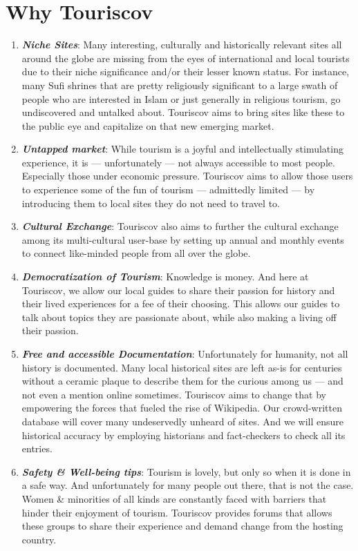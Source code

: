 \documentclass[12pt]{article}
\begin{document}
\section{Why Touriscov}
\begin{enumerate}[label= \roman*.]
    \item \textbf{\textit{Niche Sites}}: Many interesting, culturally and historically relevant sites all around the globe are missing from the eyes of international and local tourists due to their niche significance and/or their lesser known status. For instance, many Sufi shrines that are pretty religiously significant to a large swath of people who are interested in Islam or just generally in religious tourism, go undiscovered and untalked about. Touriscov aims to bring sites like these to the public eye and capitalize on that new emerging market.
    \item \textbf{\textit{Untapped market}}: While tourism is a joyful and intellectually stimulating experience, it is --- unfortunately --- not always accessible to most people. Especially those under economic pressure. Touriscov aims to allow those users to experience some of the fun of tourism --- admittedly limited --- by introducing them to local sites they do not need to travel to. 
    \item \textbf{\textit{Cultural Exchange}}: Touriscov also aims to further the cultural exchange among its multi-cultural user-base by setting up annual and monthly events to connect like-minded people from all over the globe.
    \item \textbf{\textit{Democratization of Tourism}}: Knowledge is money. And here at Touriscov, we allow our local guides to share their passion for history and their lived experiences for a fee of their choosing. This allows our guides to talk about topics they are passionate about, while also making a living off their passion.
    \item \textbf{\textit{Free and accessible Documentation}}: Unfortunately for humanity, not all history is documented. Many local historical sites are left as-is for centuries without a ceramic plaque to describe them for the curious among us --- and not even a mention online sometimes. Touriscov aims to change that by empowering the forces that fueled the rise of Wikipedia. Our crowd-written database will cover many undeservedly unheard of sites. And we will ensure historical accuracy by employing historians and fact-checkers to check all its entries. 
    \item \textbf{\textit{Safety \& Well-being tips}}: Tourism is lovely, but only so when it is done in a safe way. And unfortunately for many people out there, that is not the case. Women \& minorities of all kinds are constantly faced with barriers that hinder their enjoyment of tourism. Touriscov provides forums that allows these groups to share their experience and demand change from the hosting country.
\end{enumerate}
\end{document}
